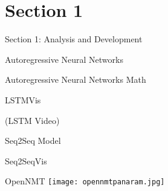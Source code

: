 \section{Section 1}


\begin{frame}{Section 1: Analysis and Development}

\end{frame}


\begin{frame}{Autoregressive Neural Networks}
\end{frame}


\begin{frame}{Autoregressive Neural Networks Math}
\end{frame}

\begin{frame}{LSTMVis}

  (LSTM Video)


\end{frame}

\begin{frame}{Seq2Seq Model}
\end{frame}

\begin{frame}{Seq2SeqVis}

  
\end{frame}


\begin{frame}{OpenNMT}
  \texttt{[image: opennmtpanaram.jpg]}
\end{frame}
